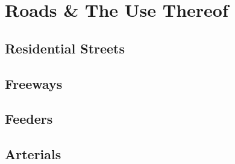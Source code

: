 \chapter{Roads \& The Use Thereof}
\minitoc
\section{Residential Streets}
\section{Freeways}
\section{Feeders}
\section{Arterials}
